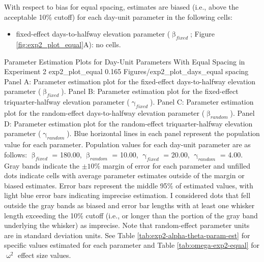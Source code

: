 \documentclass[
12pt, %
twoside,
english]{guelphthesis}
\theoremstyle{definition}
\theoremstyle{definition}
\theoremstyle{definition}
\theoremstyle{definition}
\theoremstyle{remark}
\begin{document}
With respect to bias for equal spacing, estimates are biased (i.e., above the acceptable 10\% cutoff) for each day-unit parameter in the following cells:
\begin{itemize}
\tightlist
\item
  fixed-effect days-to-halfway elevation parameter (\(\upbeta_{fixed}\); Figure \ref{fig:exp2_plot_equal}A): no cells.
\end{itemize}
\begin{apaFigure}
[portrait]
[samepage]
[-0.2cm]
{Parameter Estimation Plots for Day-Unit Parameters With Equal Spacing in Experiment 2}
{exp2_plot_equal}
{0.165}
{Figures/exp2_plot_days_equal spacing}
{Panel A: Parameter estimation plot for the fixed-effect days-to-halfway elevation parameter ($\upbeta_{fixed}$). Panel B: Parameter estimation plot for the fixed-effect triquarter-halfway elevation parameter ($\upgamma_{fixed}$). Panel C: Parameter estimation plot for the random-effect days-to-halfway elevation parameter ($\upbeta_{random}$). Panel D: Parameter estimation plot for the random-effect triquarter-halfway elevation parameter ($\upgamma_{random}$). Blue horizontal lines in each panel represent the population value for each parameter. Population values for each day-unit parameter are as follows: $\upbeta_{fixed}$ = 180.00, $\upbeta_{random}$ = 10.00, $\upgamma_{fixed}$ = 20.00, $\upgamma_{random}$ = 4.00. Gray bands indicate the $\pm 10\%$ margin of error for each parameter and unfilled dots indicate cells with average parameter estimates outside of the margin or biased estimates. Error bars represent the middle 95\% of estimated values, with light blue error bars indicating imprecise estimation. I considered dots that fell outside the gray bands as biased and error bar lengths with at least one whisker length exceeding the 10\% cutoff (i.e., or longer than the portion of the gray band underlying the whisker) as imprecise. Note that random-effect parameter units are in standard deviation units. See Table \ref{tab:exp2-alpha-theta-param-est} for specific values estimated for each parameter and Table \ref{tab:omega-exp2-equal} for $\upomega^2$ effect size values.}
\end{apaFigure}
\end{document}
